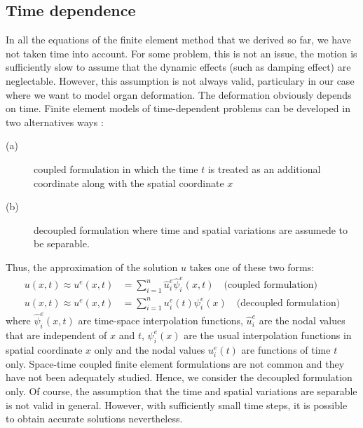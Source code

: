 	\subsection{Time dependence}
In all the equations of the finite element method that we derived so far, we have not taken time into account. For some problem, this is not an issue, the motion is sufficiently slow to assume that the dynamic effects (such as damping effect) are neglectable. However, this assumption is not always valid, particulary in our case where we want to model organ deformation. The deformation obviously depends on time. Finite element models of time-dependent problems can be developed in two alternatives ways \citep{Reddy93}:
\begin{description}
\item[(a)] coupled formulation in which the time $ t $ is treated as an additional coordinate along with the spatial coordinate $ x $
\item[(b)] decoupled formulation where time and spatial variations are assumede to be separable.
\end{description}
Thus, the approximation of the solution $ u $ takes one of these two forms:
\begin{align}
u(x, t) \approx u^e(x, t) &= \sum_{i=1}^n \hat{u}^e_i \hat{\psi}^e_i(x, t)  \quad \text{(coupled formulation)} \label{chap3:approxTime1}\\
u(x, t) \approx u^e(x, t) &= \sum_{i=1}^n u^e_i(t) \psi^e_i(x) \quad \text{(decoupled formulation)} \label{chap3:approxTime2}
\end{align}
where $ \hat{\psi}^e_i(x, t) $ are time-space interpolation functions, $ \hat{u}^e_i $ are the nodal values that are independent of $ x $ and $ t $, $ \psi^e_i(x) $ are the usual interpolation functions in spatial coordinate $ x $ only and the nodal values $ u^e_i(t) $ are functions of time $ t $ only. Space-time coupled finite element formulations are not common and they have not been adequately studied. Hence, we consider the decoupled formulation only. Of course, the assumption that the time and spatial variations are separable is not valid in general. However, with sufficiently small time steps, it is possible to obtain accurate solutions nevertheless. 

	
